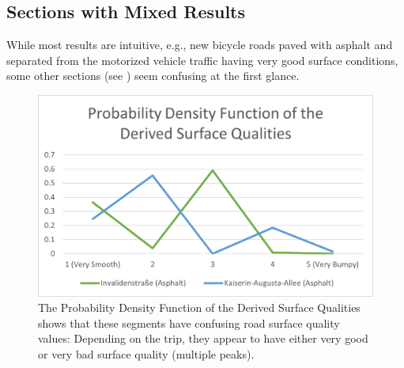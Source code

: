 \begin{table}%
\centering
\caption{Surface Quality Analysis Evaluation Results Showing Mean, Median and Standard Deviation of Sections With Clear Results}%
\label{tab:clear}
\end{table}

\subsection{Sections with Mixed Results}
\label{subsec:sections_with_mixed_results}
While most results are intuitive, e.g., new bicycle roads paved with asphalt and separated from the motorized vehicle traffic having very good surface conditions, some other sections (see ) seem confusing at the first glance.

\begin{figure}
    \centering
    \includegraphics[width=0.7\columnwidth]{fig/pdf_mixed.png}
    \caption{%
        The Probability Density Function of the Derived Surface Qualities shows that these segments have confusing road surface quality values: Depending on the trip, they appear to have either very good or very bad surface quality (multiple peaks).
    }%
    \label{fig:mixed}
\end{figure}

